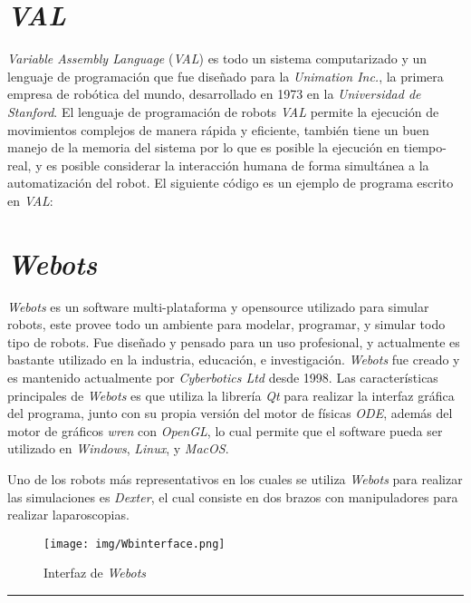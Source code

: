 \documentclass[a4paper, 12pt]{article}
\begin{document}


\section*{\emph{VAL}}
\emph{Variable Assembly Language} (\emph{VAL}) es todo un sistema computarizado
y un lenguaje de programación que fue diseñado para la \emph{Unimation Inc.},
la primera empresa de robótica del mundo, desarrollado en 1973 en la
\emph{Universidad de Stanford}. El lenguaje de programación de robots
\emph{VAL} permite la ejecución de movimientos complejos de manera rápida y
eficiente, también tiene un buen manejo de la memoria del sistema por lo que es
posible la ejecución en tiempo-real, y es posible considerar la interacción
humana de forma simultánea a la automatización del robot.
El siguiente código es un ejemplo de programa escrito en \emph{VAL}:



\section*{\emph{Webots}}
\emph{Webots} es un software multi-plataforma y opensource utilizado para
simular robots, este provee todo un ambiente para modelar, programar, y simular
todo tipo de robots. Fue diseñado y pensado para un uso profesional, y actualmente
es bastante utilizado en la industria, educación, e investigación. \emph{Webots} fue
creado y es mantenido actualmente por \emph{Cyberbotics Ltd} desde 1998.
Las características principales de \emph{Webots} es que utiliza la librería \emph{Qt}
para realizar la interfaz gráfica del programa, junto con su propia versión del
motor de físicas \emph{ODE}, además del motor de gráficos \emph{wren} con \emph{OpenGL},
lo cual permite que el software pueda ser utilizado en \emph{Windows}, \emph{Linux}, y
\emph{MacOS}.

Uno de los robots más representativos en los cuales se utiliza \emph{Webots} para
realizar las simulaciones es \emph{Dexter}, el cual consiste en dos brazos con
manipuladores para realizar laparoscopias.

\begin{figure}[!ht]
    \centering
    \texttt{[image: img/Wbinterface.png]}
    \caption{Interfaz de \emph{Webots}}
\end{figure}

\hrule



\nocite{*}
\end{document}
